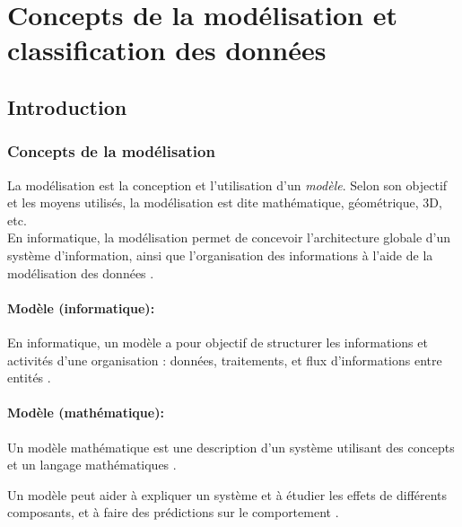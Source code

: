 	
	
	\pagebreak
	\section{Concepts de la modélisation et classification des données}
	\subsection{Introduction} \label{sec:intro_model}
	
	
	\subsubsection{\textbf{Concepts de la modélisation}}\label{subsec:modelisation}
	La modélisation est la conception et l'utilisation d'un \textit{modèle}. Selon son objectif et les moyens utilisés, la modélisation est dite mathématique, géométrique, 3D, etc. \\
	En informatique, la modélisation permet de concevoir l'architecture globale d'un système d'information, ainsi que l'organisation des informations à l'aide de la modélisation des données \cite{matloff2017statistical}.
	
	\paragraph*{Modèle (informatique):} En informatique, un modèle a pour objectif de structurer les informations et activités d'une organisation : données, traitements, et flux d'informations entre entités \cite{darlington2016regression, matloff2017statistical}.
	
	\paragraph*{Modèle (mathématique):} Un modèle mathématique est une description d'un système utilisant des concepts et un langage mathématiques \cite{darlington2016regression}.
	
	Un modèle peut aider à expliquer un système et à étudier les effets de différents composants, et à faire des prédictions sur le comportement \cite{harrell2001regression}.
	
